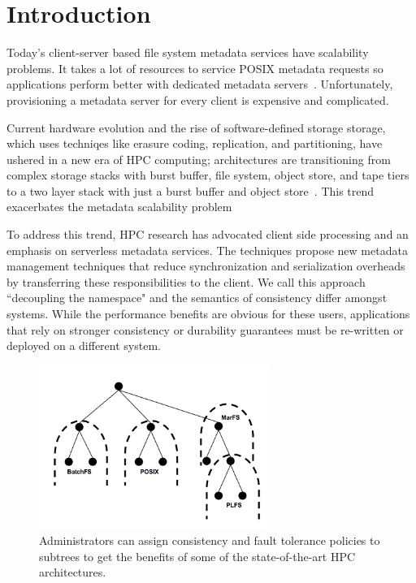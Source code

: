 \section{Introduction}

Today's client-server based file system metadata services have scalability
problems. It takes a lot of resources to service POSIX metadata requests so
applications perform better with dedicated metadata
servers~\cite{sevilla:sc15-mantle, ren:sc2014-indexfs}. Unfortunately,
provisioning a metadata server for every client is expensive and complicated.

Current hardware evolution and the rise of software-defined storage storage,
which uses techniqes like erasure coding, replication, and partitioning, have
ushered in a new era of HPC computing; architectures are transitioning from
complex storage stacks with burst buffer, file system, object store, and tape
tiers to a two layer stack with just a burst buffer and object
store~\cite{bent:login16-hpc-trends}. This trend exacerbates the metadata
scalability problem 

To address this trend, HPC research has advocated client side processing and an
emphasis on serverless metadata services.  The techniques propose new metadata
management techniques that reduce synchronization and serialization overheads
by transferring these responsibilities to the client. We call this approach
``decoupling the namespace" and the semantics of consistency differ amongst
systems.  While the performance benefits are obvious for these users,
applications that rely on stronger consistency or durability guarantees must be
re-written or deployed on a different system.  

\begin{figure}[tb]
\centering
\includegraphics[width=75mm]{figures/subtree-policies.png}
\caption{Administrators can assign consistency and fault tolerance policies to
subtrees to get the benefits of some of the state-of-the-art HPC architectures.
}\label{fig:subtree-policies}
\end{figure}

